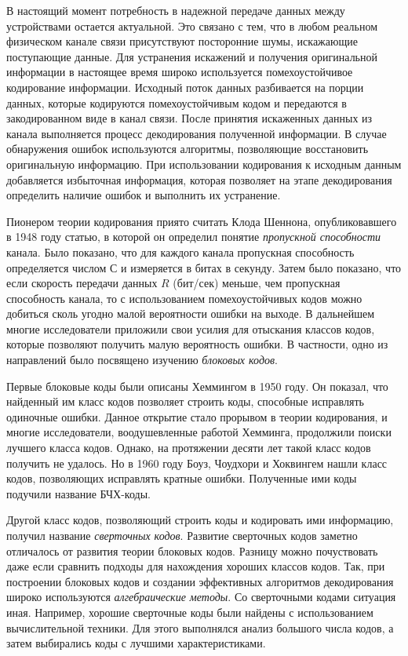﻿\Introduction

В настоящий момент потребность в надежной передаче данных между устройствами остается актуальной. Это 
связано с тем, что в любом реальном физическом канале связи присутствуют посторонние шумы, искажающие 
поступающие данные. Для устранения искажений и получения оригинальной информации в настоящее время 
широко используется помехоустойчивое кодирование информации. Исходный поток данных разбивается на 
порции данных, которые кодируются помехоустойчивым кодом и передаются в закодированном виде в канал 
связи. После принятия искаженных данных из канала выполняется процесс декодирования полученной 
информации. В случае обнаружения ошибок используются алгоритмы, позволяющие восстановить оригинальную 
информацию. При использовании кодирования к исходным данным добавляется избыточная информация, которая 
позволяет на этапе декодирования определить наличие ошибок и выполнить их устранение.

Пионером теории кодирования приято считать Клода Шеннона, опубликовавшего в 1948 году статью, в которой 
он определил понятие \textit{пропускной способности} канала. Было показано, что для каждого канала 
пропускная способность определяется числом $С$ и измеряется в битах в секунду. Затем было показано, что 
если скорость передачи данных $R$ (бит/сек) меньше, чем пропускная способность канала, то с 
использованием помехоустойчивых кодов можно добиться сколь угодно малой вероятности ошибки на выходе. В 
дальнейшем многие исследователи приложили свои усилия для отыскания классов кодов, которые позволяют 
получить малую вероятность ошибки. В частности, одно из направлений было посвящено изучению \textit{
блоковых кодов}. 

Первые блоковые коды были описаны Хеммингом в 1950 году. Он показал, что найденный им класс кодов 
позволяет строить коды, способные исправлять одиночные ошибки. Данное открытие стало прорывом в теории 
кодирования, и многие исследователи, воодушевленные работой Хемминга, продолжили поиски лучшего класса 
кодов. Однако, на протяжении десяти лет такой класс кодов получить не удалось. Но в 1960 году Боуз, 
Чоудхори и Хоквингем нашли класс кодов, позволяющих исправлять кратные ошибки. Полученные ими коды 
подучили название БЧХ-коды.

Другой класс кодов, позволяющий строить коды и кодировать ими информацию, получил название \textit{
сверточных кодов}. Развитие сверточных кодов заметно отличалось от развития теории блоковых кодов. 
Разницу можно почуствовать даже если сравнить подходы для нахождения хороших классов кодов. Так, при 
построении блоковых кодов и создании эффективных алгоритмов декодирования широко используются \textit{
алгебраические методы}. Со сверточными кодами ситуация иная. Например, хорошие сверточные коды были 
найдены с использованием вычислительной техники. Для этого выполнялся анализ большого числа кодов, а 
затем выбирались коды с лучшими характеристиками.

